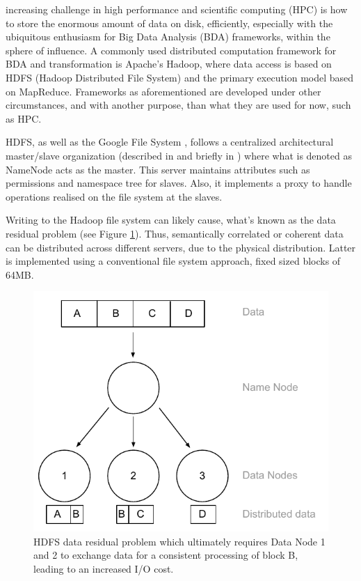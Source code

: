  increasing challenge in high performance and scientific computing (HPC) is how to store the enormous amount of data on disk, efficiently, especially with the ubiquitous enthusiasm for Big Data Analysis (BDA) frameworks, within the sphere of influence. A commonly used distributed computation framework for BDA and transformation is Apache's Hadoop\cite{PageHadoop}, where data access is based on HDFS (Hadoop Distributed File System) \cite{Shvachko:2010:HDF:1913798.1914427} and the primary execution model based on MapReduce\cite{Dean:2008:MSD:1327452.1327492}. Frameworks as aforementioned are developed under other circumstances, and with another purpose, than what they are used for now, such as HPC. 
\newline

HDFS, as well as the Google File System \cite{Ghemawat:2003:GFS:945445.945450}, follows a centralized architectural master/slave organization (described in \eg \cite{Tanenbaum:2006:DSP:1202502} and briefly in \cite{Wilkinson:1998:PPT:289352}) where what is denoted as NameNode acts as the master. This server maintains attributes such as permissions and namespace tree for slaves. Also, it implements a proxy to handle operations realised on the file system at the slaves. 
\newline

Writing to the Hadoop file system can likely cause, what's known as the data residual problem (see Figure \ref{fig:data-residual}). Thus, semantically correlated or coherent data can be distributed across different servers, due to the physical distribution. Latter is implemented using a conventional file system approach, \ie fixed sized blocks of 64MB. 
\newpage

\begin{figure}
	\centering
	\hspace*{15mm}
	\includegraphics[scale=0.8]{pdf/data-residual.pdf}
	\caption[HDFS data residual problem]{HDFS data residual problem which ultimately requires Data Node 1 and 2 to exchange data for a consistent processing of block B, leading to an increased I/O cost. \label{fig:data-residual}}
\end{figure}

